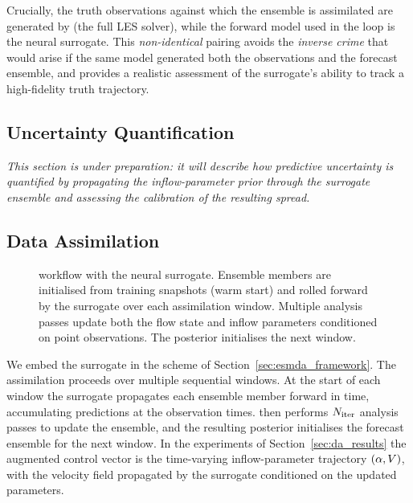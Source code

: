 Crucially, the truth observations against which the ensemble is assimilated are
generated by \palm{} (the full LES solver), while the forward model used in the
\esmda{} loop is the neural surrogate. This \emph{non-identical} pairing avoids the
\emph{inverse crime} that would arise if the same model generated both the
observations and the forecast ensemble, and provides a realistic assessment of the
surrogate's ability to track a high-fidelity truth trajectory.

\subsection{Uncertainty Quantification}
\label{sec:uq}

\textit{This section is under preparation: it will describe how predictive
uncertainty is quantified by propagating the inflow-parameter prior through the
surrogate ensemble and assessing the calibration of the resulting spread.}

\subsection{Data Assimilation}
\label{sec:esmda}

\begin{figure}[t]
  \centering
  
  \caption{\esmda{} workflow with the \pthreed{} neural surrogate. Ensemble members are
    initialised from \palm{} training snapshots (warm start) and rolled forward by
    the surrogate over each assimilation window. Multiple \esmda{} analysis passes
    update both the flow state and inflow parameters conditioned on point
    observations. The posterior initialises the next window.}
  \label{fig:esmda}
\end{figure}

We embed the surrogate in the \esmda{} scheme of Section~\ref{sec:esmda_framework}.
The assimilation proceeds over multiple sequential windows. At the start of
each window the surrogate propagates each ensemble member forward in time,
accumulating predictions at the observation times. \esmda{} then performs
$N_{\mathrm{iter}}$ analysis passes to update the ensemble, and the resulting
posterior initialises the forecast ensemble for the next window. In the
experiments of Section~\ref{sec:da_results} the augmented control vector is the
time-varying inflow-parameter trajectory $(\alpha, V)$, with the velocity
field propagated by the surrogate conditioned on the updated parameters.

